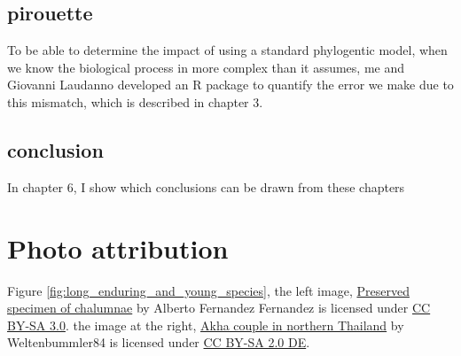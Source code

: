 \subsection{pirouette}

To be able to determine the impact of using a standard phylogentic
model, when we know the biological process in more complex than it
assumes, me and Giovanni Laudanno developed an R package 
to quantify the error we make due to this mismatch, which is described
in chapter 3.

\subsection{conclusion}

In chapter 6, I show which conclusions can be drawn from these chapters


\section{Photo attribution}

Figure \ref{fig:long_enduring_and_young_species},
the left image,
\href{https://en.wikipedia.org/wiki/File:Latimeria_Chalumnae_-_Coelacanth_-_NHMW.jpg}{Preserved specimen of chalumnae}
by Alberto Fernandez Fernandez
is licensed under \href{https://creativecommons.org/licenses/by-sa/3.0/deed.en}{CC BY-SA 3.0}.
the image at the right,
\href{https://commons.wikimedia.org/wiki/File:Akha_cropped_hires.JPG}{Akha couple in northern Thailand}
by Weltenbummler84
is licensed under \href{https://creativecommons.org/licenses/by-sa/2.0/de/deed.en}{CC BY-SA 2.0 DE}.

